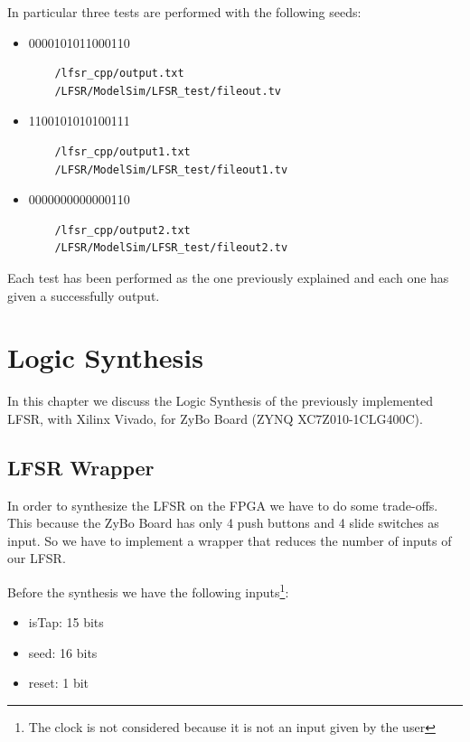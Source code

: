 \documentclass[a4paper]{report}
\begin{document}
\noindent In particular three tests are performed with the following seeds:
\begin{itemize}
	\item 0000101011000110 
	\begin{Verbatim}
	/lfsr_cpp/output.txt
	/LFSR/ModelSim/LFSR_test/fileout.tv
	\end{Verbatim}
	\item 1100101010100111
	\begin{Verbatim}
	/lfsr_cpp/output1.txt
	/LFSR/ModelSim/LFSR_test/fileout1.tv
	\end{Verbatim}
	\item 0000000000000110
	\begin{Verbatim}
	/lfsr_cpp/output2.txt
	/LFSR/ModelSim/LFSR_test/fileout2.tv
	\end{Verbatim}
\end{itemize}
Each test has been performed as the one previously explained and each one has given a successfully output.
\chapter{Logic Synthesis}
In this chapter we discuss the Logic Synthesis of the previously implemented LFSR, with Xilinx Vivado, for ZyBo Board (ZYNQ XC7Z010-1CLG400C).

\section{LFSR Wrapper}
In order to synthesize the LFSR on the FPGA we have to do some trade-offs. This because the ZyBo Board has only 4 push buttons and 4 slide switches as input. So we have to implement a wrapper that reduces the number of inputs of our LFSR.

\noindent Before the synthesis we have the following inputs\footnote{The clock is not considered because it is not an input given by the user}:
\begin{itemize}
	\item isTap: 15 bits
	\item seed: 16 bits
	\item reset: 1 bit
\end{itemize}  
\end{document}
